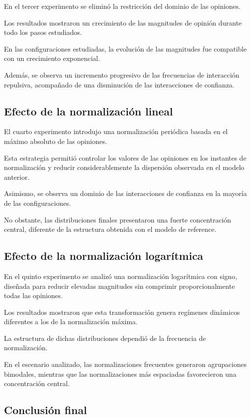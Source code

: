 \documentclass[11pt,a4paper]{article}
\begin{document}
En el tercer experimento se eliminó la restricción del dominio de las opiniones.

Los resultados mostraron un crecimiento de las magnitudes de opinión durante todo los pasos estudiados.

En las configuraciones estudiadas, la evolución de las magnitudes fue compatible con un crecimiento exponencial.

Además, se observa un incremento progresivo de las frecuencias de interacción repulsiva, acompañado de una disminución de las interacciones de confianza.

\subsection{Efecto de la normalización lineal}

El cuarto experimento introdujo una normalización periódica basada en el máximo absoluto de las opiniones.

Esta estrategia permitió controlar los valores de las opiniones en los instantes de normalización y reducir considerablemente la dispersión observada en el modelo anterior.

Asimismo, se observa un dominio de las interacciones de confianza en la mayoría de las configuraciones.

No obstante, las distribuciones finales presentaron una fuerte concentración central, diferente de la estructura obtenida con el modelo de reference.

\subsection{Efecto de la normalización logarítmica}

En el quinto experimento se analizó una normalización logarítmica con signo, diseñada para reducir elevadas magnitudes sin comprimir proporcionalmente todas las opiniones.

Los resultados mostraron que esta transformación genera regímenes dinámicos diferentes a los de la normalización máxima.

La estructura de dichas distribuciones dependió de la frecuencia de normalización.

En el escenario analizado, las normalizaciones frecuentes generaron agrupaciones bimodales, mientras que las normalizaciones más espaciadas favorecieron una concentración central.

\subsection{Conclusión final}
\end{document}
